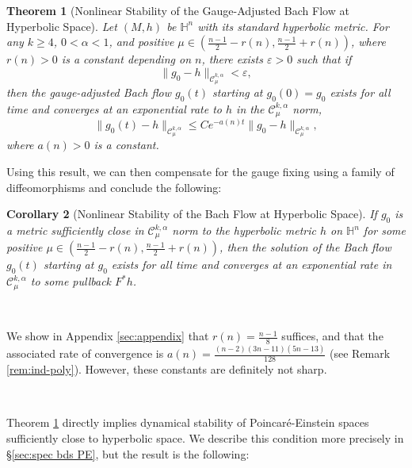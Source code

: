 \documentclass[10pt,reqno]{amsart}
\newtheorem{theorem}{Theorem}[section]
\newtheorem{cor}[theorem]{Corollary}
\newcommand{\vep}{\varepsilon}
\begin{document}
\begin{theorem}[Nonlinear Stability of the Gauge-Adjusted Bach Flow at Hyperbolic Space]  \label{thm:main-2}  Let $(M,h)$ be $\mathbb H^n$ with its standard hyperbolic metric. For any $k\geq 4$, $0<\alpha<1$, and positive 
$\mu \in (\frac{n-1}{2} - r(n), \frac{n-1}{2}+r(n))$, where $r(n) > 0$ is a  constant depending on $n$, there exists $\vep > 0$ such that if  
\begin{equation*}
\| g_0 - h \|_{\mathcal C^{k,\alpha}_{\mu}} < \vep,
\end{equation*}
then the gauge-adjusted Bach flow $g_0(t)$ starting at $g_0(0) = g_0$ exists for all time and converges at an exponential rate to $h$ in the $\mathcal C^{k,\alpha}_{\mu}$ norm,
\begin{equation}\label{eqn:exp-decay}
\| g_0 (t) - h \|_{\mathcal C^{k,\alpha}_{\mu}} \leq C e^{-a(n) t}  \| g_0 - h \|_{ \mathcal C^{k,\alpha}_{\mu}},
\end{equation}
where $a(n)>0$ is a constant.
\end{theorem}
Using this result, we can then compensate for the gauge fixing using a family of diffeomorphisms and conclude the following:
\begin{cor}[Nonlinear Stability of the Bach Flow at Hyperbolic Space]  \label{cor:main-2}  If $g_0$ is a metric sufficiently close in $\mathcal C^{k,\alpha}_\mu$ norm to the hyperbolic metric $h$ on $\mathbb H^n$
for some positive $\mu \in (\frac{n-1}{2} -r(n), \frac{n-1}{2}+r(n))$, then the solution of the Bach flow $g_0(t)$ starting at $g_0$ exists 
for all time and converges at an exponential rate in $\mathcal C^{k,\alpha}_\mu$ to some pullback $F^*h$.
\end{cor}

\

We show in Appendix \ref{sec:appendix} that $r(n) =\frac{n-1}{8}$ suffices, and that the associated rate of convergence is $a(n)= \frac{(n-2)(3n-11)(5n-13)}{128}$ (see Remark \ref{rem:ind-poly}).  However, these constants are definitely not sharp.

\

Theorem \ref{thm:main-2} directly implies dynamical stability of Poincar\'e-Einstein spaces sufficiently close to hyperbolic space. We describe this condition 
more precisely in \S \ref{sec:spec bds PE}, but the result is the following: 
\end{document}
